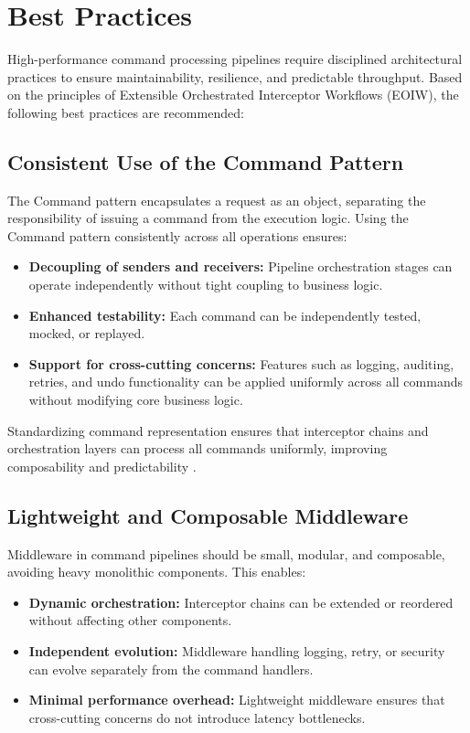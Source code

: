 \section{Best Practices}

High-performance command processing pipelines require disciplined architectural practices to ensure maintainability, resilience, and predictable throughput. Based on the principles of Extensible Orchestrated Interceptor Workflows (EOIW), the following best practices are recommended:

\subsection{Consistent Use of the Command Pattern}
The Command pattern encapsulates a request as an object, separating the responsibility of issuing a command from the execution logic. Using the Command pattern consistently across all operations ensures:

\begin{itemize}
    \item \textbf{Decoupling of senders and receivers:} Pipeline orchestration stages can operate independently without tight 
    coupling to business logic.
    \item \textbf{Enhanced testability:} Each command can be independently tested, mocked, or replayed.
    \item \textbf{Support for cross-cutting concerns:} Features such as logging, auditing, retries, and undo functionality can be applied uniformly across all commands without modifying core business logic.
\end{itemize}

Standardizing command representation ensures that interceptor chains and orchestration layers can process all commands uniformly, improving composability and predictability \cite{gamma1994design}.

\subsection{Lightweight and Composable Middleware}
Middleware in command pipelines should be small, modular, and composable, avoiding heavy monolithic components. This enables:

\begin{itemize}
    \item \textbf{Dynamic orchestration:} Interceptor chains can be extended or reordered without affecting other components.
    \item \textbf{Independent evolution:} Middleware handling logging, retry, or security can evolve separately from the command handlers.
    \item \textbf{Minimal performance overhead:} Lightweight middleware ensures that cross-cutting concerns do not introduce latency bottlenecks.
\end{itemize}

